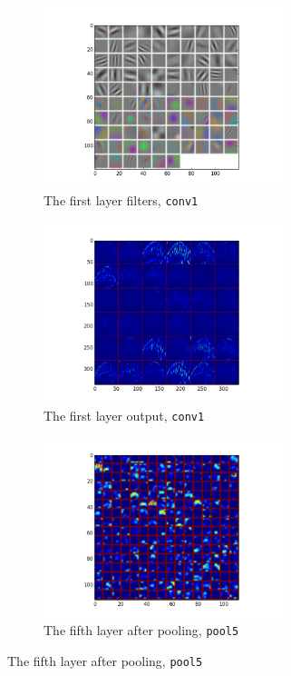 \begin{figure}[htbp]
  \centering
  \begin{subfigure}[t]{0.45\textwidth}
      \centering
      \includegraphics[width=7cm]{preprocess/paramconv1}
      \caption{The first layer filters, \texttt{conv1}}
  \end{subfigure}

  \begin{subfigure}[t]{0.45\textwidth}
      \centering
      \includegraphics[width=7cm]{preprocess/blob20conv1}
      \caption{The first layer output, \texttt{conv1}}
  \end{subfigure}
  \begin{subfigure}[t]{0.45\textwidth}
      \centering
      \includegraphics[width=7cm]{preprocess/blob20pool5}
      \caption{The fifth layer after pooling, \texttt{pool5}}
  \end{subfigure}


\end{figure}
